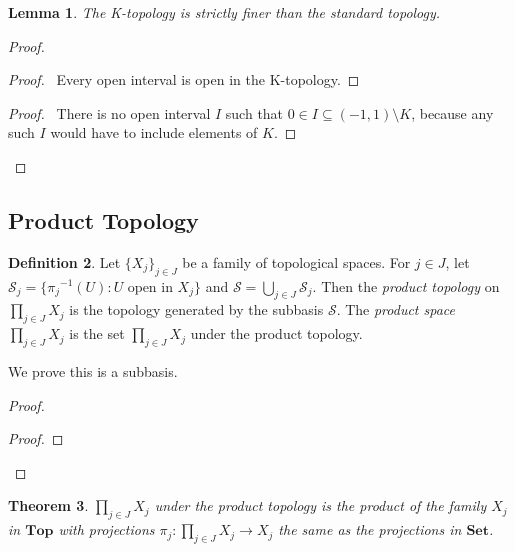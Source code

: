 \documentclass{book}
\newtheorem{lm}{Lemma}[chapter]
\newtheorem{thm}[lm]{Theorem}
\theoremstyle{definition}
\newtheorem{df}[lm]{Definition}
\newcommand{\inv}[1]{\ensuremath{{#1}^{-1}}}
\newcommand{\Set}{\ensuremath{\mathbf{Set}}}
\newcommand{\Top}{\ensuremath{\mathbf{Top}}}
\begin{document}
  \begin{lm}
    The K-topology is strictly finer than the standard topology.
  \end{lm}
  
  \begin{proof}
    \begin{proof}
      \pf\ Every open interval is open in the K-topology.
    \end{proof}
    \begin{proof}
      \pf\ There is no open interval $I$ such that $0 \in I \subseteq (-1, 1) 
      \setminus K$, because any such $I$ would have to include elements of $K$.
    \end{proof}
  \end{proof}
  
  \subsection{Product Topology}
  
  \begin{df}
    Let $\{ X_j \}_{j \in J}$ be a family of topological spaces. For $j \in J$, 
    let $\mathcal{S}_j = \{ \inv{\pi_j}(U) : U \text{ open in } X_j \}$ and 
    $\mathcal{S} = \bigcup_{j \in J} \mathcal{S}_j$. Then the \emph{product 
      topology} on $\prod_{j \in J} X_j$ is the topology generated by the 
    subbasis 
    $\mathcal{S}$. The \emph{product space} $\prod_{j \in J} X_j$ is the set 
    $\prod_{j \in J} X_j$ under the product topology.
    
    We prove this is a subbasis.
  \end{df}
  
  \begin{proof}
    \begin{proof}
      \step{1c}{$x \in \inv{\pi_j}(X_j) \in \mathcal{S}$}
    \end{proof}
  \end{proof}
  
  \begin{thm}
    $\prod_{j \in J} X_j$ under the product topology is the product of the 
    family 
    $X_j$ in $\Top$ with projections $\pi_j : \prod_{j \in J} X_j \rightarrow 
    X_j$ 
    the same as the projections in $\Set$.
  \end{thm}
  
\end{document}
